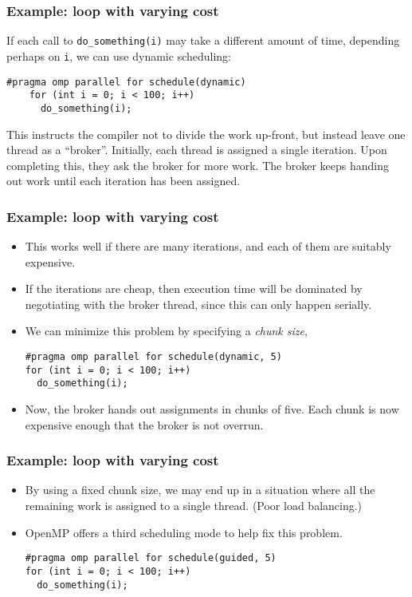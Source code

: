 \begin{frame}[fragile]
  \frametitle{Example: loop with varying cost}
  If each call to \texttt{do\_something(i)} may take a different amount of time,
  depending perhaps on \texttt{i}, we can use dynamic scheduling:
  \begin{lstlisting}[style=c]
    #pragma omp parallel for schedule(dynamic)
    for (int i = 0; i < 100; i++)
      do_something(i);
  \end{lstlisting}
  This instructs the compiler not to divide the work up-front, but instead leave
  one thread as a ``broker''. Initially, each thread is assigned a single
  iteration. Upon completing this, they ask the broker for more work. The broker
  keeps handing out work until each iteration has been assigned.
\end{frame}

\begin{frame}[fragile]
  \frametitle{Example: loop with varying cost}
  \begin{itemize}
  \item This works well if there are many iterations, and each of them are
    suitably expensive.
  \item If the iterations are cheap, then execution time will be dominated by
    negotiating with the broker thread, since this can only happen serially.
  \item We can minimize this problem by specifying a \emph{chunk size},
  \begin{lstlisting}[style=c]
#pragma omp parallel for schedule(dynamic, 5)
for (int i = 0; i < 100; i++)
  do_something(i);
  \end{lstlisting}
  \item Now, the broker hands out assignments in chunks of five. Each chunk is
    now expensive enough that the broker is not overrun.
  \end{itemize}
\end{frame}

\begin{frame}[fragile]
  \frametitle{Example: loop with varying cost}
  \begin{itemize}
  \item By using a fixed chunk size, we may end up in a situation where all the
    remaining work is assigned to a single thread. (Poor load balancing.)
  \item OpenMP offers a third scheduling mode to help fix this problem.
  \begin{lstlisting}[style=c]
#pragma omp parallel for schedule(guided, 5)
for (int i = 0; i < 100; i++)
  do_something(i);
  \end{lstlisting}
  \end{itemize}
\end{frame}

